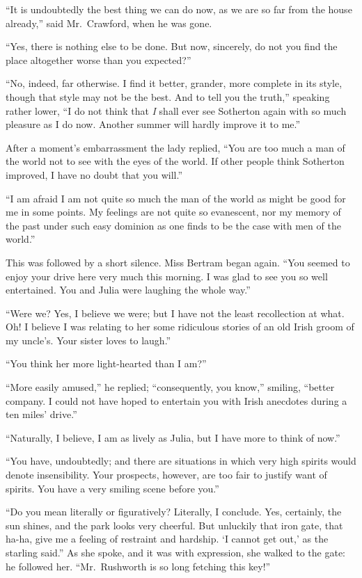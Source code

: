 \documentclass{article}
\begin{document}
``It is undoubtedly the best thing we can do now, as we
are so far from the house already,'' said Mr.\ Crawford,
when he was gone.

``Yes, there is nothing else to be done.  But now, sincerely,
do not you find the place altogether worse than you expected?''

``No, indeed, far otherwise.  I find it better, grander, more
complete in its style, though that style may not be the best.
And to tell you the truth,'' speaking rather lower, ``I do not
think that \emph{I} shall ever see Sotherton again with so much
pleasure as I do now.  Another summer will hardly improve it to
me.''

After a moment's embarrassment the lady replied, ``You are
too much a man of the world not to see with the eyes
of the world.  If other people think Sotherton improved,
I have no doubt that you will.''

``I am afraid I am not quite so much the man of the world
as might be good for me in some points.  My feelings
are not quite so evanescent, nor my memory of the past
under such easy dominion as one finds to be the case
with men of the world.''

This was followed by a short silence.  Miss Bertram
began again.  ``You seemed to enjoy your drive here very much
this morning.  I was glad to see you so well entertained.
You and Julia were laughing the whole way.''

``Were we?  Yes, I believe we were; but I have not
the least recollection at what.  Oh!  I believe
I was relating to her some ridiculous stories
of an old Irish groom of my uncle's. Your sister loves to laugh.''

``You think her more light-hearted than I am?''

``More easily amused,'' he replied; ``consequently, you know,''
smiling, ``better company.  I could not have hoped
to entertain you with Irish anecdotes during a ten miles' drive.''

``Naturally, I believe, I am as lively as Julia, but I
have more to think of now.''

``You have, undoubtedly; and there are situations in
which very high spirits would denote insensibility.
Your prospects, however, are too fair to justify want
of spirits.  You have a very smiling scene before you.''

``Do you mean literally or figuratively?  Literally,
I conclude.  Yes, certainly, the sun shines, and the park
looks very cheerful.  But unluckily that iron gate,
that ha-ha, give me a feeling of restraint and hardship.
`I cannot get out,' as the starling said.''  As she spoke,
and it was with expression, she walked to the gate:
he followed her.  ``Mr.\ Rushworth is so long fetching
this key!''
\end{document}
